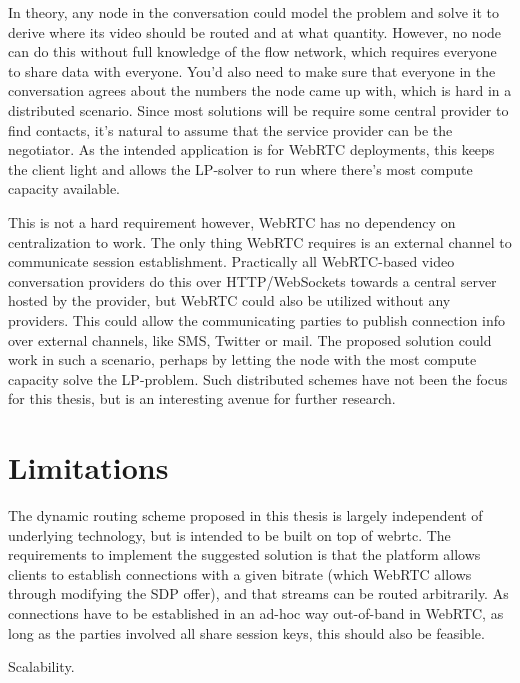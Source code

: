 In theory, any node in the conversation could model the problem and solve it to derive where its video should be routed and at what quantity. However, no node can do this without full knowledge of the flow network, which requires everyone to share data with everyone. You'd also need to make sure that everyone in the conversation agrees about the numbers the node came up with, which is hard in a distributed scenario. Since most solutions will be require some central provider to find contacts, it's natural to assume that the service provider can be the negotiator. As the intended application is for WebRTC deployments, this keeps the client light and allows the LP-solver to run where there's most compute capacity available.

This is not a hard requirement however, WebRTC has no dependency on centralization to work. The only thing WebRTC requires is an external channel to communicate session establishment. Practically all WebRTC-based video conversation providers do this over HTTP/WebSockets towards a central server hosted by the provider, but WebRTC could also be utilized without any providers. This could allow the communicating parties to publish connection info over external channels, like SMS, Twitter or mail. The proposed solution could work in such a scenario, perhaps by letting the node with the most compute capacity solve the LP-problem. Such distributed schemes have not been the focus for this thesis, but is an interesting avenue for further research.


\section{Limitations}

The dynamic routing scheme proposed in this thesis is largely independent of underlying technology, but is intended to be built on top of \gls{webrtc}. The requirements to implement the suggested solution is that the platform allows clients to establish connections with a given bitrate (which WebRTC allows through modifying the SDP offer), and that streams can be routed arbitrarily. As connections have to be established in an ad-hoc way out-of-band in WebRTC, as long as the parties involved all share session keys, this should also be feasible.


Scalability.


